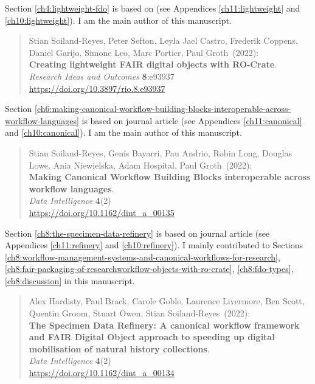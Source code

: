 Section \ref{ch4:lightweight-fdo} is based on \cite{Soiland-Reyes 2022c} (see Appendices \ref{ch11:lightweight} and \ref{ch10:lightweight}). I am the main author of this manuscript.

\begin{quote}
    \small
    Stian Soiland-Reyes, Peter Sefton, Leyla Jael Castro, Frederik Coppens, Daniel Garijo, Simone Leo, Marc Portier, Paul Groth~(2022): \\
    \textbf{Creating lightweight FAIR digital objects with RO-Crate}.\\
    \emph{Research Ideas and Outcomes} \textbf{8}:e93937 \\
    \url{https://doi.org/10.3897/rio.8.e93937}    
\end{quote}

Section \ref{ch6:making-canonical-workflow-building-blocks-interoperable-across-workflow-languages} is based on journal article \cite{Soiland-Reyes 2022b} (see Appendices \ref{ch11:canonical} and \ref{ch10:canonical}). I am the main author of this manuscript.

\begin{quote}
    \small
    Stian Soiland-Reyes, Genís Bayarri, Pau Andrio, Robin Long, Douglas Lowe, Ania Niewielska, Adam Hospital, Paul Groth~(2022): \\
    \textbf{Making Canonical Workflow Building Blocks interoperable across workflow languages}.\\
    \emph{Data Intelligence} \textbf{4}(2)\\
    \url{https://doi.org/10.1162/dint_a_00135}    
\end{quote}

Section \ref{ch8:the-specimen-data-refinery} is based on journal article \cite{Hardisty 2022} (see Appendices \ref{ch11:refinery} and \ref{ch10:refinery}). I mainly contributed to Sections \ref{ch8:workflow-management-systems-and-canonical-workflows-for-research}, \ref{ch8:fair-packaging-of-researchworkflow-objects-with-ro-crate}, \ref{ch8:fdo-types}, \ref{ch8:discussion} in this manuscript.

\begin{quote}
    \small
    Alex Hardisty, Paul Brack, Carole Goble, Laurence Livermore, Ben Scott, Quentin Groom, Stuart Owen, Stian Soiland-Reyes~(2022): \\
    \textbf{The Specimen Data Refinery: A canonical workflow framework and FAIR Digital Object approach to speeding up digital mobilisation of natural history collections}.\\
    \emph{Data Intelligence} \textbf{4}(2)\\
    \url{https://doi.org/10.1162/dint_a_00134}    
\end{quote}

